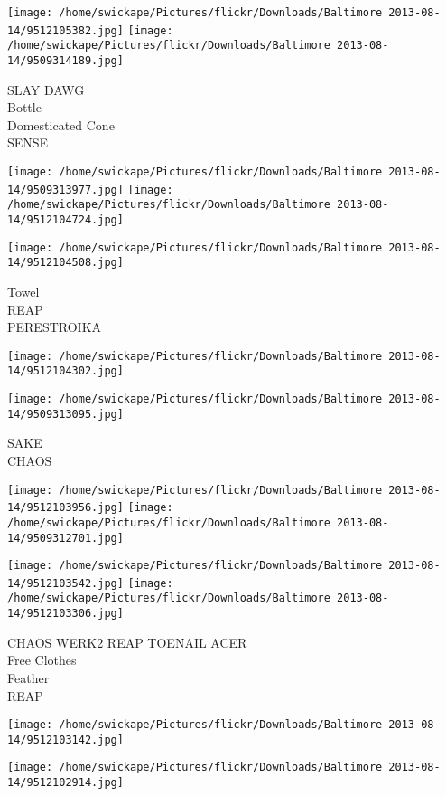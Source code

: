 \documentclass[10pt,letterpaper]{article}
\begin{document}
\texttt{[image: /home/swickape/Pictures/flickr/Downloads/Baltimore 2013-08-14/9512105382.jpg]}
\texttt{[image: /home/swickape/Pictures/flickr/Downloads/Baltimore 2013-08-14/9509314189.jpg]}

SLAY DAWG\\
Bottle\\
Domesticated Cone\\
SENSE
\pagebreak

\texttt{[image: /home/swickape/Pictures/flickr/Downloads/Baltimore 2013-08-14/9509313977.jpg]}
\texttt{[image: /home/swickape/Pictures/flickr/Downloads/Baltimore 2013-08-14/9512104724.jpg]}

\vspace{0.25in}
\texttt{[image: /home/swickape/Pictures/flickr/Downloads/Baltimore 2013-08-14/9512104508.jpg]}

Towel\\
REAP\\
PERESTROIKA
\pagebreak

\texttt{[image: /home/swickape/Pictures/flickr/Downloads/Baltimore 2013-08-14/9512104302.jpg]}

\vspace{0.25in}
\texttt{[image: /home/swickape/Pictures/flickr/Downloads/Baltimore 2013-08-14/9509313095.jpg]}

SAKE\\
CHAOS
\pagebreak

\texttt{[image: /home/swickape/Pictures/flickr/Downloads/Baltimore 2013-08-14/9512103956.jpg]}
\texttt{[image: /home/swickape/Pictures/flickr/Downloads/Baltimore 2013-08-14/9509312701.jpg]}

\texttt{[image: /home/swickape/Pictures/flickr/Downloads/Baltimore 2013-08-14/9512103542.jpg]}
\texttt{[image: /home/swickape/Pictures/flickr/Downloads/Baltimore 2013-08-14/9512103306.jpg]}

CHAOS WERK2 REAP TOENAIL ACER\\
Free Clothes\\
Feather\\
REAP
\pagebreak

\texttt{[image: /home/swickape/Pictures/flickr/Downloads/Baltimore 2013-08-14/9512103142.jpg]}

\vspace{0.25in}
\texttt{[image: /home/swickape/Pictures/flickr/Downloads/Baltimore 2013-08-14/9512102914.jpg]}
\end{document}
